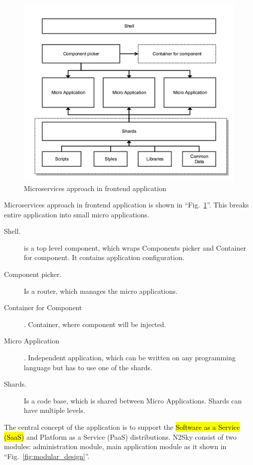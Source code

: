 \begin{figure}[htbp]
\begin{center}
  \includegraphics[width=\linewidth]{components/2/frontend_arch.png}
  \caption{Microservices approach in frontend application}
  \label{fig:frontend_arch}
\end{center}
\end{figure}


Microservices approach in frontend application is shown in ``Fig.~\ref{fig:frontend_arch}''. This breaks entire application into small micro applications.

\begin{description}
\item[Shell.]  is a top level component, which wraps Components picker and Container for component. It contains application configuration.
\item[Component picker.] Is a router, which manages the micro applications. 
\item[Container for Component]. Container, where component will be injected.
\item[Micro Application]. Independent application, which can be written on any programming language but has to use one of the shards.
\item[Shards.] Is a code base, which is shared between Micro Applications. Shards can have multiple levels. 
\end{description}
 

The central concept of the application is to support the \hl{Software as a Service (SaaS)} and Platform as a Service (PaaS) distributions.  N2Sky consist of two modules: administration module, main application module as it shown in ``Fig.~\ref{fig:modular_design}''.

